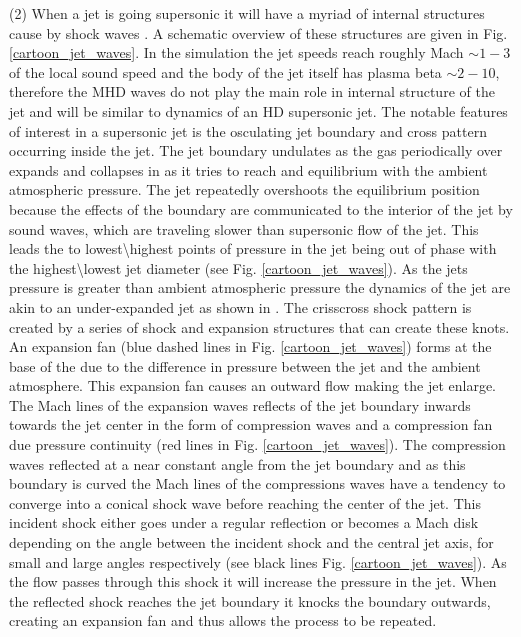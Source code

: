 \documentclass[12pt]{ociamthesis}
\begin{document}
\par (2) When a jet is going supersonic it will have a myriad of internal structures cause by shock waves \citep{Norman1982}. A schematic overview of these structures are given in Fig. \eqref{cartoon_jet_waves}. In the simulation the jet speeds reach roughly Mach $\sim 1-3$ of the local sound speed and the body of the jet itself has plasma beta $\sim 2-10$, therefore the MHD waves do not play the main role in internal structure of the jet and will be similar to dynamics of an HD supersonic jet. The notable features of interest in a supersonic jet is the osculating jet boundary and cross pattern occurring inside the jet. The jet boundary undulates as the gas periodically over expands and collapses in as it tries to reach and equilibrium with the ambient atmospheric pressure. The jet repeatedly overshoots the equilibrium position because the effects of the boundary are communicated to the interior of the jet by sound waves, which are traveling slower than supersonic flow of the jet. This leads the to lowest\textbackslash highest points of pressure in the jet being out of phase with the highest\textbackslash lowest jet diameter (see Fig. \eqref{cartoon_jet_waves}). As the jets pressure is greater than ambient atmospheric pressure the dynamics of the jet are akin to an under-expanded jet as shown in \cite{Norman1982,Edgington-Mitchell2014}. The crisscross shock pattern is created by a series of shock and expansion structures that can create these knots. An expansion fan (blue dashed lines in Fig. \eqref{cartoon_jet_waves}) forms at the base of the due to the difference in pressure between the jet and the ambient atmosphere. This expansion fan causes an outward flow making the jet enlarge. The Mach lines of the expansion waves reflects of the jet boundary inwards towards the jet center in the form of compression waves and a compression fan due pressure continuity (red lines in Fig. \eqref{cartoon_jet_waves}). The compression waves reflected at a near constant angle from the jet boundary and as this boundary is curved the Mach lines of the compressions waves have a tendency to converge into a conical shock wave before reaching the center of the jet. This incident shock either goes under a regular reflection or becomes a Mach disk depending on the angle between the incident shock and the central jet axis, for small and large angles respectively (see black lines Fig. \eqref{cartoon_jet_waves}). As the flow passes through this shock it will increase the pressure in the jet. When the reflected shock reaches the jet boundary it knocks the boundary outwards, creating an expansion fan and thus allows the process to be repeated.
\end{document}
